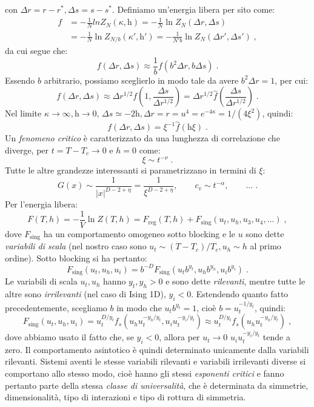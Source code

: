 \documentclass[12pt,a4paper]{article}
\theoremstyle{definition}
\numberwithin{equation}{section}
\begin{document}
con $\Delta r=r-r^*,\Delta s=s-s^*$. Definiamo un'energia libera per sito come:
\begin{align}
f&= -\frac{1}{N}ln Z_N(\kappa,\mathrm{h})=-\frac{1}{N}\ln Z_N(\Delta r,\Delta s) \\
&= -\frac{1}{N}\ln Z_{N/b}(\kappa',\mathrm{h}')=-\frac{1}{N'b}\ln Z_N(\Delta r',\Delta s')\;,
\end{align}
da cui segue che:
\begin{equation}
f(\Delta r,\Delta s)\approx \frac{1}{b}f(b^2\Delta r,b\Delta s)\;.
\end{equation}
Essendo $b$ arbitrario, possiamo sceglierlo in modo tale da avere $b^2\Delta r=1$, per cui:
\begin{equation}
f(\Delta r,\Delta s)\approx \Delta r^{1/2}f\left(1,\frac{\Delta s}{\Delta r^{1/2}}\right)=\Delta r^{1/2}\stackrel{\sim}{f}\left(\frac{\Delta s}{\Delta r^{1/2}}\right)\;.
\end{equation}
Nel limite $\kappa\to\infty,\mathrm{h}\to 0$, $\Delta s\simeq -2\mathrm{h},\Delta r=r=u^4=e^{-4\kappa}=1/(4\xi^2)$, quindi:
\begin{equation}
f(\Delta r,\Delta s)=\xi^{-1}\stackrel{\sim}{f}(\mathrm{h}\xi)\;.
\end{equation}
Un \emph{fenomeno critico} è caratterizzato da una lunghezza di correlazione che diverge, per $t=T-T_c\to 0$ e $h=0$ come:
$$
\xi\sim t^{-\nu}\;.
$$
Tutte le altre grandezze interessanti si parametrizzano in termini di $\xi$:
$$
G(x)\sim \frac{1}{|x|^{D-2+\eta}}=\frac{1}{\xi^{D-2+\eta}},\qquad c_v\sim t^{-\alpha},\qquad \ldots\;.
$$
Per l'energia libera:
\begin{equation}
F(T,h)=-\frac{1}{V}\ln Z(T,h)=F_{\mathrm{reg}}(T,h)+F_{\mathrm{sing}}(u_t,u_h,u_3,u_4,\ldots)\;,
\end{equation}
dove $F_{\mathrm{sing}}$ ha un comportamento omogeneo sotto blocking e le $u$ sono dette \emph{variabili di scala} (nel nostro caso sono $u_t\sim (T-T_c)/T_c,u_h\sim h$ al primo ordine). Sotto blocking si ha pertanto:
\begin{equation}
F_{\mathrm{sing}}(u_t,u_h,u_i)=b^{-D}F_{\mathrm{sing}}(u_tb^{y_t},u_hb^{y_h},u_ib^{y_i})\;.
\end{equation}
Le variabili di scala $u_t,u_h$ hanno $y_t,y_h>0$ e sono dette \emph{rilevanti}, mentre tutte le altre sono \emph{irrilevanti} (nel caso di Ising 1D), $y_i<0$. Estendendo quanto fatto precedentemente, scegliamo $b$ in modo che $u_tb^{y_t}=1$, cioè $b=u_t^{-1/y_t}$, quindi:
\begin{equation}
F_{\mathrm{sing}}(u_t,u_h,u_i)=u_t^{D/y_t}f_s(u_hu_t^{-y_h/y_t},u_iu_t^{-y_i/y_t})\approx u_t^{D/y_t}f_s(u_hu_t^{-y_h/y_t})\;,
\end{equation}
dove abbiamo usato il fatto che, se $y_i<0$, allora per $u_t\to 0$ $u_iu_t^{-y_i/y_t}$ tende a zero. Il comportamento asintotico è quindi determinato unicamente dalla variabili rilevanti. Sistemi aventi le stesse variabili rilevanti e variabili irrilevanti diverse si comportano allo stesso modo, cioè hanno gli stessi \emph{esponenti critici} e fanno pertanto parte della stessa \emph{classe di universalità}, che è determinata da simmetrie, dimensionalità, tipo di interazioni e tipo di rottura di simmetria.
\end{document}
